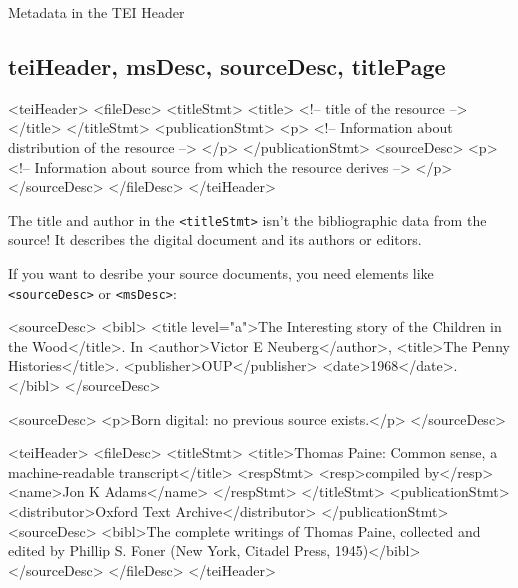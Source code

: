 \begin{frame}{Metadata in the TEI Header}
\subsection{teiHeader, msDesc, sourceDesc, titlePage}
\small

\begin{xmlcode}
<teiHeader>
 <fileDesc>
  <titleStmt>
   <title>
<!-- title of the resource -->
   </title>
  </titleStmt>
  <publicationStmt>
   <p>
<!-- Information about distribution of the resource -->
   </p>
  </publicationStmt>
  <sourceDesc>
   <p>
<!-- Information about source from which the resource derives -->
   </p>
  </sourceDesc>
 </fileDesc>
</teiHeader>
\end{xmlcode}


The title and author in the \texttt{<titleStmt>} isn't the bibliographic data from the source! It describes the digital document and its authors or editors.

If you want to desribe your source documents, you need elements like \texttt{<sourceDesc>} or \texttt{<msDesc>}:
\begin{xmlcode}
<sourceDesc>
 <bibl>
  <title level="a">The Interesting story of the Children 
  in the Wood</title>. In
 <author>Victor E Neuberg</author>, <title>The Penny Histories</title>.
 <publisher>OUP</publisher>
  <date>1968</date>. </bibl>
</sourceDesc>
\end{xmlcode}

\begin{xmlcode}
<sourceDesc>
 <p>Born digital: no previous source exists.</p>
</sourceDesc>
\end{xmlcode}

\begin{xmlcode}
<teiHeader>
 <fileDesc>
  <titleStmt>
   <title>Thomas Paine: Common sense, a
       machine-readable transcript</title>
   <respStmt>
    <resp>compiled by</resp>
    <name>Jon K Adams</name>
   </respStmt>
  </titleStmt>
  <publicationStmt>
   <distributor>Oxford Text Archive</distributor>
  </publicationStmt>
  <sourceDesc>
   <bibl>The complete writings of Thomas Paine, collected and edited
       by Phillip S. Foner (New York, Citadel Press, 1945)</bibl>
  </sourceDesc>
 </fileDesc>
</teiHeader>
\end{xmlcode}

\end{frame}

